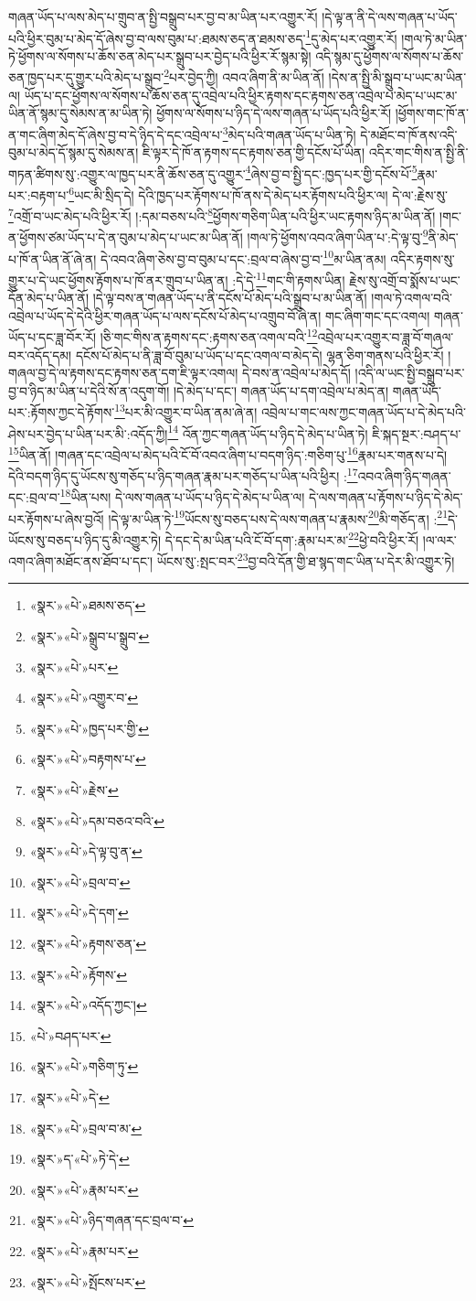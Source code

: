 གཞན་ཡོད་པ་ལས་མེད་པ་གྲུབ་ན་སྤྱི་བསྒྲུབ་པར་བྱ་བ་མ་ཡིན་པར་འགྱུར་རོ། །དེ་ལྟ་ན་ནི་དེ་ལས་གཞན་པ་ཡོད་པའི་ཕྱིར་བུམ་པ་མེད་དོ་ཞེས་བྱ་བ་ལས་བུམ་པ་:ཐམས་ཅད་ན་ཐམས་ཅད་\footnote{«སྣར་»«པེ་»ཐམས་ཅད་}དུ་མེད་པར་འགྱུར་རོ། །གལ་ཏེ་མ་ཡིན་ཏེ་ཕྱོགས་ལ་སོགས་པ་ཆོས་ཅན་མེད་པར་སྒྲུབ་པར་བྱེད་པའི་ཕྱིར་རོ་སྙམ་སྟེ། འདི་སྙམ་དུ་ཕྱོགས་ལ་སོགས་པ་ཆོས་ཅན་ཁྱད་པར་དུ་གྱུར་པའི་མེད་པ་སྒྲུབ་\footnote{«སྣར་»«པེ་»སྒྲུབ་པ་སྒྲུབ་}པར་བྱེད་ཀྱི། འབའ་ཞིག་ནི་མ་ཡིན་ནོ། །དེས་ན་སྤྱི་མི་སྒྲུབ་པ་ཡང་མ་ཡིན་ལ། ཡོད་པ་དང་ཕྱོགས་ལ་སོགས་པ་ཆོས་ཅན་དུ་འབྲེལ་པའི་ཕྱིར་རྟགས་དང་རྟགས་ཅན་འབྲེལ་པ་མེད་པ་ཡང་མ་ཡིན་ནོ་སྙམ་དུ་སེམས་ན་མ་ཡིན་ཏེ། ཕྱོགས་ལ་སོགས་པ་ཉིད་དེ་ལས་གཞན་པ་ཡོད་པའི་ཕྱིར་རོ། །ཕྱོགས་གང་ཁོ་ན་ན་གང་ཞིག་མེད་དོ་ཞེས་བྱ་བ་དེ་ཉིད་དེ་དང་འབྲེལ་པ་\footnote{«སྣར་»«པེ་»པར་}མེད་པའི་གཞན་ཡོད་པ་ཡིན་ཏེ། དེ་མཐོང་བ་ཁོ་ནས་འདི་བུམ་པ་མེད་དོ་སྙམ་དུ་སེམས་ན། ཇི་ལྟར་དེ་ཁོ་ན་རྟགས་དང་རྟགས་ཅན་གྱི་དངོས་པོ་ཡིན། འདིར་གང་གིས་ན་སྤྱི་ནི་གཏན་ཚིགས་སུ་:འགྱུར་ལ་ཁྱད་པར་ནི་ཆོས་ཅན་དུ་འགྱུར་\footnote{«སྣར་»«པེ་»འགྱུར་བ་}ཞེས་བྱ་བ་སྤྱི་དང་:ཁྱད་པར་གྱི་དངོས་པོ་\footnote{«སྣར་»«པེ་»ཁྱད་པར་གྱི་}རྣམ་པར་:བརྟག་པ་\footnote{«སྣར་»«པེ་»བརྟགས་པ་}ཡང་མི་སྲིད་དེ། དེའི་ཁྱད་པར་རྟོགས་པ་ཁོ་ནས་དེ་མེད་པར་རྟོགས་པའི་ཕྱིར་ལ། དེ་ལ་:རྗེས་སུ་\footnote{«སྣར་»«པེ་»རྗེས་}འགྲོ་བ་ཡང་མེད་པའི་ཕྱིར་རོ། །:དམ་བཅས་པའི་\footnote{«སྣར་»«པེ་»དམ་བཅའ་བའི་}ཕྱོགས་གཅིག་ཡིན་པའི་ཕྱིར་ཡང་རྟགས་ཉིད་མ་ཡིན་ནོ། །གང་ན་ཕྱོགས་ཙམ་ཡོད་པ་དེ་ན་བུམ་པ་མེད་པ་ཡང་མ་ཡིན་ནོ། །གལ་ཏེ་ཕྱོགས་འབའ་ཞིག་ཡིན་པ་:དེ་ལྟ་བུ་\footnote{«སྣར་»«པེ་»དེ་ལྟ་བུ་ན་}ནི་མེད་པ་ཁོ་ན་ཡིན་ནོ་ཞེ་ན། དེ་འབའ་ཞིག་ཅེས་བྱ་བ་བུམ་པ་དང་:བྲལ་བ་ཞེས་བྱ་བ་\footnote{«སྣར་»«པེ་»བྲལ་བ་}མ་ཡིན་ནམ། འདིར་རྟགས་སུ་གྱུར་པ་དེ་ཡང་ཕྱོགས་རྟོགས་པ་ཁོ་ནར་གྲུབ་པ་ཡིན་ན། :དེ་དེ་\footnote{«སྣར་»«པེ་»དེ་དག་}གང་གི་རྟགས་ཡིན། རྗེས་སུ་འགྲོ་བ་སྨོས་པ་ཡང་དོན་མེད་པ་ཡིན་ནོ། །དེ་ལྟ་བས་ན་གཞན་ཡོད་པ་ནི་དངོས་པོ་མེད་པའི་སྒྲུབ་པ་མ་ཡིན་ནོ། །གལ་ཏེ་འགལ་བའི་འབྲེལ་པ་ཡོད་དེ་དེའི་ཕྱིར་གཞན་ཡོད་པ་ལས་དངོས་པོ་མེད་པ་འགྲུབ་བོ་ཞེ་ན། གང་ཞིག་གང་དང་འགལ། གཞན་ཡོད་པ་དང་ཟླ་བོར་རོ། །ཅི་གང་གིས་ན་རྟགས་དང་:རྟགས་ཅན་འགལ་བའི་\footnote{«སྣར་»«པེ་»རྟགས་ཅན་}འབྲེལ་པར་འགྱུར་བ་ཟླ་བོ་གཞལ་བར་འདོད་དམ། དངོས་པོ་མེད་པ་ནི་ཟླ་བོ་བུམ་པ་ཡོད་པ་དང་འགལ་བ་མེད་དེ། ལྷན་ཅིག་གནས་པའི་ཕྱིར་རོ། །གཞལ་བྱ་དེ་ལ་རྟགས་དང་རྟགས་ཅན་དག་ཇི་ལྟར་འགལ། དེ་བས་ན་འབྲེལ་པ་མེད་དོ། །འདི་ལ་ཡང་སྤྱི་བསྒྲུབ་པར་བྱ་བ་ཉིད་མ་ཡིན་པ་དེའི་སོ་ན་འདུག་གོ། །དེ་མེད་པ་དང་། གཞན་ཡོད་པ་དག་འབྲེལ་པ་མེད་ན། གཞན་ཡོད་པར་:རྟོགས་ཀྱང་དེ་རྟོགས་\footnote{«སྣར་»«པེ་»རྟོགས་}པར་མི་འགྱུར་བ་ཡིན་ནམ་ཞེ་ན། འབྲེལ་པ་གང་ལས་ཀྱང་གཞན་ཡོད་པ་དེ་མེད་པའི་ཤེས་པར་བྱེད་པ་ཡིན་པར་མི་:འདོད་ཀྱི།\footnote{«སྣར་»«པེ་»འདོད་ཀྱང་།} འོན་ཀྱང་གཞན་ཡོད་པ་ཉིད་དེ་མེད་པ་ཡིན་ཏེ། ཇི་སྐད་སྔར་:བཤད་པ་\footnote{«པེ་»བཤད་པར་}ཡིན་ནོ། །གཞན་དང་འབྲེལ་པ་མེད་པའི་ངོ་བོ་འབའ་ཞིག་པ་བདག་ཉིད་:གཅིག་པུ་\footnote{«སྣར་»«པེ་»གཅིག་ཏུ་}རྣམ་པར་གནས་པ་དེ། དེའི་བདག་ཉིད་དུ་ཡོངས་སུ་གཅོད་པ་ཉིད་གཞན་རྣམ་པར་གཅོད་པ་ཡིན་པའི་ཕྱིར། :\footnote{«སྣར་»«པེ་»དེ་}འབའ་ཞིག་ཉིད་གཞན་དང་:བྲལ་བ་\footnote{«སྣར་»«པེ་»བྲལ་བ་མ་}ཡིན་པས། དེ་ལས་གཞན་པ་ཡོད་པ་ཉིད་དེ་མེད་པ་ཡིན་ལ། དེ་ལས་གཞན་པ་རྟོགས་པ་ཉིད་དེ་མེད་པར་རྟོགས་པ་ཞེས་བྱའོ། །དེ་ལྟ་མ་ཡིན་ཏེ་\footnote{«སྣར་»ད་«པེ་»ཏེ་དེ་}ཡོངས་སུ་བཅད་པས་དེ་ལས་གཞན་པ་རྣམས་\footnote{«སྣར་»«པེ་»རྣམ་པར་}མི་གཅོད་ན། :\footnote{«སྣར་»«པེ་»ཉིད་གཞན་དང་བྲལ་བ་}དེ་ཡོངས་སུ་བཅད་པ་ཉིད་དུ་མི་འགྱུར་ཏེ། དེ་དང་དེ་མ་ཡིན་པའི་ངོ་བོ་དག་:རྣམ་པར་མ་\footnote{«སྣར་»«པེ་»རྣམ་པར་}ཕྱེ་བའི་ཕྱིར་རོ། །ལ་ལར་འགའ་ཞིག་མཐོང་ནས་ཐོབ་པ་དང་། ཡོངས་སུ་:སྤང་བར་\footnote{«སྣར་»«པེ་»སྤོངས་པར་}བྱ་བའི་དོན་གྱི་ཐ་སྙད་གང་ཡིན་པ་དེར་མི་འགྱུར་ཏེ། 